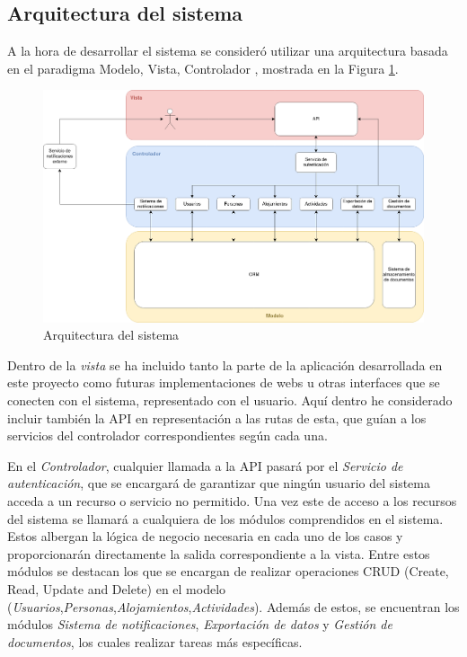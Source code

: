 \subsection{Arquitectura del sistema}
\label{sec:arq}

A la hora de desarrollar el sistema se consideró utilizar una arquitectura basada en el paradigma Modelo, Vista, Controlador \cite{mvc}, mostrada en la Figura \ref{fig:arq}. 

\begin{figure}[H]
    \centering
    \includegraphics[width=\textwidth]{diseno/sistema/Arquitectura.png}
    \caption{Arquitectura del sistema}
    \label{fig:arq}
\end{figure}

Dentro de la \textit{vista} se ha incluido tanto la parte de la aplicación desarrollada en este proyecto como futuras implementaciones de webs u otras interfaces que se conecten con el sistema, representado con el usuario. Aquí dentro he considerado incluir también la API en representación a las rutas de esta, que guían a los servicios del controlador correspondientes según cada una. 

En el \textit{Controlador}, cualquier llamada a la API pasará por el \textit{Servicio de autenticación}, que se encargará de garantizar que ningún usuario del sistema acceda a un recurso o servicio no permitido. Una vez este de acceso a los recursos del sistema se llamará a cualquiera de los módulos comprendidos en el sistema. Estos albergan la lógica de negocio necesaria en cada uno de los casos y proporcionarán directamente la salida correspondiente a la vista. Entre estos módulos se destacan los que se encargan de realizar operaciones CRUD (Create, Read, Update and Delete) en el modelo (\textit{Usuarios},\textit{Personas},\textit{Alojamientos},\textit{Actividades}). Además de estos, se encuentran los módulos \textit{Sistema de notificaciones}, \textit{Exportación de datos} y \textit{Gestión de documentos}, los cuales realizar tareas más específicas.

